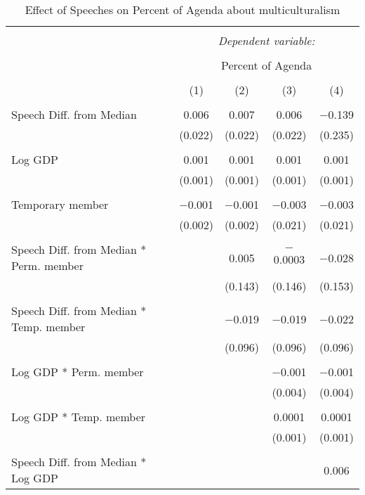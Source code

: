 
\begin{table}[!htbp] \centering 
  \caption{Effect of Speeches on Percent of Agenda about multiculturalism} 
  \label{} 
\begin{tabular}{@{\extracolsep{5pt}}lcccc} 
\\[-1.8ex]\hline 
\hline \\[-1.8ex] 
 & \multicolumn{4}{c}{\textit{Dependent variable:}} \\ 
\cline{2-5} 
\\[-1.8ex] & \multicolumn{4}{c}{Percent of Agenda} \\ 
\\[-1.8ex] & (1) & (2) & (3) & (4)\\ 
\hline \\[-1.8ex] 
 Speech Diff. from Median & 0.006 & 0.007 & 0.006 & $-$0.139 \\ 
  & (0.022) & (0.022) & (0.022) & (0.235) \\ 
  & & & & \\ 
 Log GDP & 0.001 & 0.001 & 0.001 & 0.001 \\ 
  & (0.001) & (0.001) & (0.001) & (0.001) \\ 
  & & & & \\ 
 Temporary member & $-$0.001 & $-$0.001 & $-$0.003 & $-$0.003 \\ 
  & (0.002) & (0.002) & (0.021) & (0.021) \\ 
  & & & & \\ 
 Speech Diff. from Median * Perm. member &  & 0.005 & $-$0.0003 & $-$0.028 \\ 
  &  & (0.143) & (0.146) & (0.153) \\ 
  & & & & \\ 
 Speech Diff. from Median * Temp. member &  & $-$0.019 & $-$0.019 & $-$0.022 \\ 
  &  & (0.096) & (0.096) & (0.096) \\ 
  & & & & \\ 
 Log GDP * Perm. member &  &  & $-$0.001 & $-$0.001 \\ 
  &  &  & (0.004) & (0.004) \\ 
  & & & & \\ 
 Log GDP * Temp. member &  &  & 0.0001 & 0.0001 \\ 
  &  &  & (0.001) & (0.001) \\ 
  & & & & \\ 
 Speech Diff. from Median * Log GDP &  &  &  & 0.006 \\ 

\end{tabular}
\end{table}
